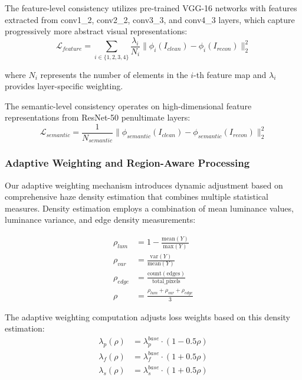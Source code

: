 \documentclass{article}
\begin{document}
The feature-level consistency utilizes pre-trained VGG-16 networks with features extracted from conv1\_2, conv2\_2, conv3\_3, and conv4\_3 layers, which capture progressively more abstract visual representations:
\begin{equation}
\mathcal{L}_{feature} = \sum_{i \in \{1,2,3,4\}} \frac{\lambda_i}{N_i} \|\phi_i(I_{clean}) - \phi_i(I_{recon})\|_2^2
\end{equation}

where $N_i$ represents the number of elements in the $i$-th feature map and $\lambda_i$ provides layer-specific weighting.

The semantic-level consistency operates on high-dimensional feature representations from ResNet-50 penultimate layers:
\begin{equation}
\mathcal{L}_{semantic} = \frac{1}{N_{semantic}} \|\phi_{semantic}(I_{clean}) - \phi_{semantic}(I_{recon})\|_2^2
\end{equation}

\subsubsection{Adaptive Weighting and Region-Aware Processing}

Our adaptive weighting mechanism introduces dynamic adjustment based on comprehensive haze density estimation that combines multiple statistical measures. Density estimation employs a combination of mean luminance values, luminance variance, and edge density measurements:

\begin{align}
\rho_{lum} &= 1 - \frac{\text{mean}(Y)}{\text{max}(Y)} \\
\rho_{var} &= \frac{\text{var}(Y)}{\text{mean}(Y)} \\
\rho_{edge} &= \frac{\text{count}(\text{edges})}{\text{total\_pixels}} \\
\rho &= \frac{\rho_{lum} + \rho_{var} + \rho_{edge}}{3}
\end{align}

The adaptive weighting computation adjusts loss weights based on this density estimation:
\begin{align}
\lambda_p(\rho) &= \lambda_p^{base} \cdot (1 - 0.5\rho) \\
\lambda_f(\rho) &= \lambda_f^{base} \cdot (1 + 0.5\rho) \\
\lambda_s(\rho) &= \lambda_s^{base} \cdot (1 + 0.5\rho)
\end{align}
\end{document}
